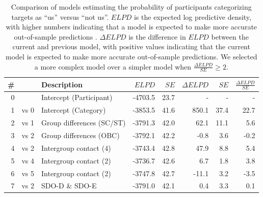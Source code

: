 \documentclass[12pt, a4paper]{article}
\begin{document}
\begin{table}
\caption{
Comparison of models estimating the probability of participants categorizing targets as ``us'' versus ``not us''. $\textit{ELPD}$ is the expected log predictive density, with higher numbers indicating that a model is expected to make more accurate out-of-sample predictions \protect\cite{vehtari_practical_2017}. $\Delta\textit{ELPD}$ is the difference in $\textit{ELPD}$ between the current and previous model, with positive values indicating that the current model is expected to make more accurate out-of-sample predictions. We selected a more complex model over a simpler model when $\frac{\Delta\textit{ELPD}}{\textit{SE}} \geq 2$.%
}
\centering
{}
\small
\begin{tabularx}{\linewidth}{r@{~}rXrrrrr} \toprule
\# &  & Description & $\textit{ELPD}$ & $\textit{SE}$ & $\Delta\textit{ELPD}$ & $\textit{SE}$ & $\frac{\Delta\textit{ELPD}}{\textit{SE}}$ \\ \midrule 
0 &      & Intercept (Participant) & -4703.5 & 23.7 &     - &    - &    - \\ 
1 & vs 0 & Intercept (Category)    & -3853.5 & 41.6 & 850.1 & 37.4 & 22.7 \\
2 & vs 1 & Group differences (SC/ST)       & -3791.3 & 42.0 &  62.1 & 11.1 &  5.6 \\
3 & vs 2 & Group differences (OBC)         & -3792.1 & 42.2 &  -0.8 &  3.6 & -0.2 \\ \midrule
4 & vs 2 & Intergroup contact (4) & -3743.4 & 42.8 &  47.9 &  8.8 &  5.4 \\
5 & vs 4 & Intergroup contact (2) & -3736.7 & 42.6 &   6.7 &  1.8 &  3.8 \\
6 & vs 5 & Intergroup contact (2) & -3747.8 & 42.7 & -11.1 &  3.2 & -3.5 \\
7 & vs 2 & SDO-D \& SDO-E & -3791.0 & 42.1 &   0.4 &  3.3 &  0.1 \\
\bottomrule
\end{tabularx}
\label{tab:t2}
\end{table}
\end{document}
